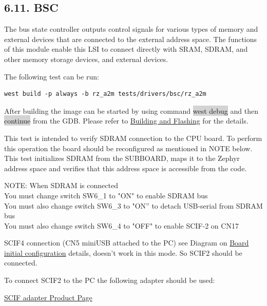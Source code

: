 \documentclass[11pt,a4paper,oneside]{article}
\begin{document}
\subsection*{6.11. BSC}\label{bsc}

The bus state controller outputs control signals for various types of
memory and external devices that are connected to the external address
space. The functions of this module enable this LSI to connect directly
with SRAM, SDRAM, and other memory storage devices, and external
devices.

The following test can be run:

\begin{lstlisting}
west build -p always -b rz_a2m tests/drivers/bsc/rz_a2m
\end{lstlisting}

After building the image can be started by using command \colorbox{lightgray}{west debug}
and then \colorbox{lightgray}{continue} from the GDB. Please refer to
\hyperref[building-and-flashing]{Building and Flashing} for the
details.

This test is intended to verify SDRAM connection to the CPU board. To
perform this operation the board should be reconfigured as mentioned in
NOTE below. This test initializes SDRAM from the SUBBOARD, maps it to
the Zephyr address space and verifies that this address space is
accessible from the code.

NOTE: When SDRAM is connected\\
You must change switch SW6\_1 to "ON" to enable SDRAM bus\\
You must also change switch SW6\_3 to "ON'' to detach USB-serial from
SDRAM bus\\
You must also change switch SW6\_4 to "OFF" to enable SCIF-2 on CN17

SCIF4 connection (CN5 miniUSB attached to the PC) see Diagram on
\hyperref[board-initial-configuration]{Board initial configuration}
details, doesn't work in this mode. So SCIF2 should be connected.

To connect SCIF2 to the PC the following adapter should be used:

\href{https://www.ebay.com/itm/374576049950?hash=item573678ef1e:g:v1sAAOSwx7pkGapp&amdata=enc%3AAQAIAAAA8MQ4P8oojMoR6H4TwJkrlrD0d39kQ7hfOOSnDeCt%2Bp3hjsAZsig8OM8eNojvjmkFV5rzU3w89k8DUQRijARt5vJV6nEF8vslmPLoG%2F9rEO4iy%2BYYnA8w3IR8Vqh7fuWcA2zkr1483%2FK4b1ianYJT%2BRnJkO5w%2FmHajRHkP8Et5fxsovnGXJH58bJCnbJTqB5lLAcFF%2FmVTEn86GlCnc0GgqxhcNJVjpJRhxwsb49LQajClAH%2F%2BU01LcJBLxqCBABTiPj0GPFBi%2BjUOX3uDEhu1qCSVopHX%2BfdeM3TS2k9qYZbvkRViqIr%2FZfGa5AprKoH9w%3D%3D%7Ctkp%3ABFBM1rL9heNi}{SCIF adapter Product Page}
\end{document}
